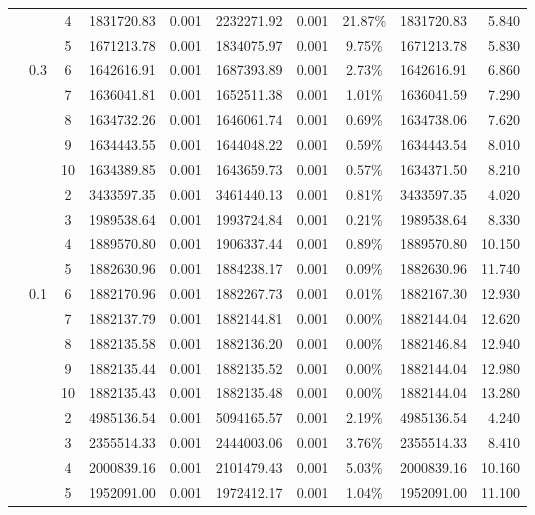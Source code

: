 {\begin{longtable}{cccrcrrcrr}
			&       & 4     & 1831720.83 & 0.001 & 2232271.92 & 0.001 & 21.87\% & 1831720.83 & 5.840 \\
			&       & 5     & 1671213.78 & 0.001 & 1834075.97 & 0.001 & 9.75\% & 1671213.78 & 5.830 \\
			& 0.3   & 6     & 1642616.91 & 0.001 & 1687393.89 & 0.001 & 2.73\% & 1642616.91 & 6.860 \\
			&       & 7     & 1636041.81 & 0.001 & 1652511.38 & 0.001 & 1.01\% & 1636041.59 & 7.290 \\
			&       & 8     & 1634732.26 & 0.001 & 1646061.74 & 0.001 & 0.69\% & 1634738.06 & 7.620 \\
			&       & 9     & 1634443.55 & 0.001 & 1644048.22 & 0.001 & 0.59\% & 1634443.54 & 8.010 \\
			&       & 10    & 1634389.85 & 0.001 & 1643659.73 & 0.001 & 0.57\% & 1634371.50 & 8.210 \\
			\cmidrule(r){3-10}
			&       & 2     & 3433597.35 & 0.001 & 3461440.13 & 0.001 & 0.81\% & 3433597.35 & 4.020 \\
			&       & 3     & 1989538.64 & 0.001 & 1993724.84 & 0.001 & 0.21\% & 1989538.64 & 8.330 \\
			&       & 4     & 1889570.80 & 0.001 & 1906337.44 & 0.001 & 0.89\% & 1889570.80 & 10.150 \\
			&       & 5     & 1882630.96 & 0.001 & 1884238.17 & 0.001 & 0.09\% & 1882630.96 & 11.740 \\
			& 0.1   & 6     & 1882170.96 & 0.001 & 1882267.73 & 0.001 & 0.01\% & 1882167.30 & 12.930 \\
			&       & 7     & 1882137.79 & 0.001 & 1882144.81 & 0.001 & 0.00\% & 1882144.04 & 12.620 \\
			&       & 8     & 1882135.58 & 0.001 & 1882136.20 & 0.001 & 0.00\% & 1882146.84 & 12.940 \\
			&       & 9     & 1882135.44 & 0.001 & 1882135.52 & 0.001 & 0.00\% & 1882144.04 & 12.980 \\
			&       & 10    & 1882135.43 & 0.001 & 1882135.48 & 0.001 & 0.00\% & 1882144.04 & 13.280 \\
			&       & 2     & 4985136.54 & 0.001 & 5094165.57 & 0.001 & 2.19\% & 4985136.54 & 4.240 \\
			&       & 3     & 2355514.33 & 0.001 & 2444003.06 & 0.001 & 3.76\% & 2355514.33 & 8.410 \\
			&       & 4     & 2000839.16 & 0.001 & 2101479.43 & 0.001 & 5.03\% & 2000839.16 & 10.160 \\
			&       & 5     & 1952091.00 & 0.001 & 1972412.17 & 0.001 & 1.04\% & 1952091.00 & 11.100 \\

\end{longtable}}

